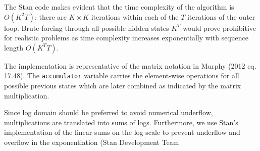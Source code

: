 \documentclass[]{article}
\begin{document}
The Stan code makes evident that the time complexity of the algorithm is
\(O(K^2T)\): there are \(K \times K\) iterations within each of the
\(T\) iterations of the outer loop. Brute-forcing through all possible
hidden states \(K^T\) would prove prohibitive for realistic problems as
time complexity increases exponentially with sequence length
\(O(K^TT)\).

The implementation is representative of the matrix notation in Murphy
(2012 eq. 17.48). The \texttt{accumulator} variable carries the
element-wise operations for all possible previous states which are later
combined as indicated by the matrix multiplication.

Since log domain should be preferred to avoid numerical underflow,
multiplications are translated into sums of logs. Furthermore, we use
Stan's implementation of the linear sums on the log scale to prevent
underflow and overflow in the exponentiation (Stan Development Team
\end{document}
